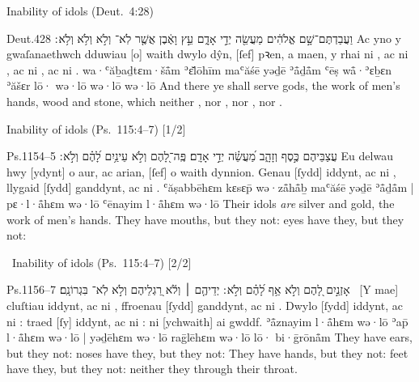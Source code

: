 \begin{frame}{\ex Inability of idols \hfill (Deut.~4:28)}
	\begin{example}{Deut.}{4}{28}{}{}
		\quoling
		{וַעֲבַדְתֶּם־שָׁ֣ם אֱלֹהִ֔ים מַעֲשֵׂ֖ה יְדֵ֣י אָדָ֑ם עֵ֣ץ וָאֶ֔בֶן אֲשֶׁ֤ר לֹֽא־ וְלֹ֣א  וְלֹ֥א  וְלֹ֥א ׃}
		{Ac yno y gwaſanaethwch dduwiau [o] waith dwylo dŷn, [ſef] pꝛen, a maen, y rhai ni , ac ni , ac ni , ac ni .}
		{wa·ʿăḇaḏtɛm·šå̄m ʾɛ̆lōhīm maʿăśē yəḏē ʾå̄ḏå̄m ʿēṣ wå̄·ʾɛḇɛn ʾăšɛr lō· wə·lō  wə·lō  wə·lō }
		{And there ye shall serve gods, the work of men’s hands, wood and stone, which neither , nor , nor , nor .}
	\end{example}
\end{frame}



\begin{frame}{\ex Inability of idols \hfill (Ps.~115:4–7) [1/2]}
	\begin{example}{Ps.}{115}{4–5}{}{}
		\quoling
		{%
			עֲצַבֵּיהֶם כֶּ֣סֶף וְזָהָ֑ב מַ֝עֲשֵׂ֗ה יְדֵ֣י אָדָֽם׃
			פֶּֽה־לָ֭הֶם וְלֹ֣א  עֵינַ֥יִם לָ֝הֶ֗ם וְלֹ֣א ׃
		}
		{%
			Eu delwau hwy [ydynt] o aur, ac arian, [ſef] o waith dynnion.
			Genau [ſydd] iddynt, ac ni , llygaid [ſydd] ganddynt, ac ni .
		}
		{%
			ʿăṣabbēhɛm kɛsɛp̄ wə·zå̄hå̄ḇ maʿăśē yəḏē ʾå̄ḏå̄m |
			pɛ·l·å̄hɛm wə·lō  ʿēnayim l·å̄hɛm wə·lō 
		}
		{%
			Their idols \textit{are} silver and gold, the work of men’s hands.
			They have mouths, but they  not: eyes have they, but they  not:
		}
	\end{example}
\end{frame}



\begin{frame}{\excont\ Inability of idols \hfill (Ps.~115:4–7) [2/2]}
	\begin{example}{Ps.}{115}{6–7}{}{}
		\quoling
		{%
			אָזְנַ֣יִם לָ֭הֶם וְלֹ֣א  אַ֥ף לָ֝הֶ֗ם וְלֹ֣א ׃
			יְדֵיהֶ֤ם ׀ וְלֹ֬א  רַ֭גְלֵיהֶם וְלֹ֣א  לֹֽא־ בִּגְרוֹנָֽם׃
		}
		{%
			~[Y mae] cluſtiau iddynt, ac ni , ffroenau [ſydd] ganddynt, ac ni .
			Dwylo [ſydd] iddynt, ac ni : traed [ſy] iddynt, ac ni : ni  [ychwaith] ai gwddf.
		}
		{%
			ʾå̄znayim l·å̄hɛm wə·lō  ʾap̄ l·å̄hɛm wə·lō  |
			yəḏēhɛm wə·lō  raḡlēhɛm wə·lō  lō· bi·ḡrōnå̄m
		}
		{%
			They have ears, but they  not: noses have they, but they  not:
			They have hands, but they  not: feet have they, but they  not: neither  they through their throat.
		}
	\end{example}
\end{frame}



